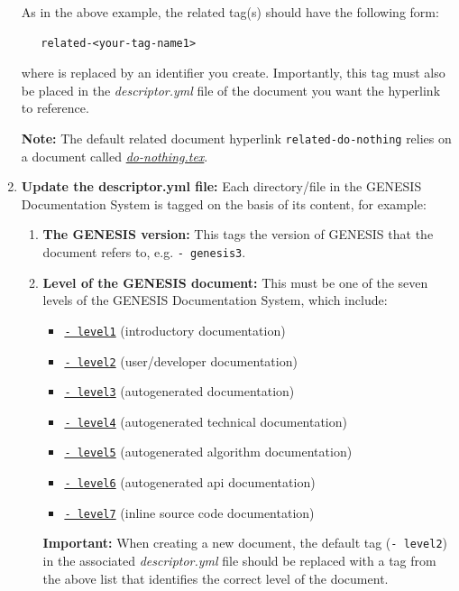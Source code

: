 \documentclass[12pt]{article}
\begin{document}
\begin{enumerate}
As in the above example, the related tag(s) should have the following form:
\begin{verbatim}
   related-<your-tag-name1>
\end{verbatim}
where {\tt <your-tag-name1>} is replaced by an identifier you create. Importantly, this tag must also be placed in the {\it descriptor.yml} file of the document you want the hyperlink to reference.

{\bf Note:} The default related document hyperlink {\tt related-do-nothing} relies on a document called \href{../do-nothing/do-nothing.tex}{\it do-nothing.tex}. 

\item {\bf Update the descriptor.yml file:} Each directory/file in the GENESIS Documentation System is tagged on the basis of its content, for example:

   \begin{enumerate}

      \item  {\bf The GENESIS version:} This tags the version of GENESIS that the document refers to, e.g. {\tt -\,genesis3}.

      \item {\bf Level of the GENESIS document:} This must be one of the seven levels of the GENESIS Documentation System, which include:
      
      \begin{itemize}
         \item[]\href{../contents-level1/contents-level1.tex}{\tt -\,level1} (introductory documentation)
         \item[]\href{../contents-level2/contents-level2.tex}{\tt -\,level2} (user/developer documentation)
         \item[]\href{../contents-level3/contents-level3.tex}{\tt -\,level3} (autogenerated documentation)
         \item[]\href{../contents-level4/contents-level4.tex}{\tt -\,level4} (autogenerated technical documentation)
         \item[]\href{../contents-level5/contents-level5.tex}{\tt -\,level5} (autogenerated algorithm documentation)
         \item[]\href{../contents-level6/contents-level6.tex}{\tt -\,level6} (autogenerated api documentation)
         \item[]\href{../contents-level7/contents-level7.tex}{\tt -\,level7} (inline source code documentation)
      \end{itemize}
{\bf Important:} When creating a new document, the default tag ({\tt -\,level2}) in the associated {\it descriptor.yml} file should be replaced with a tag from the above list that identifies the correct level of the document.


\end{enumerate}
\end{enumerate}
\end{document}

